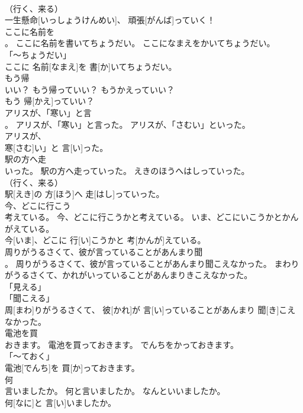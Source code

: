 \documentclass[8pt]{extreport}
\begin{document}
\begin{CJK}{UTF8}{min}
\\	（行く、来る） 
\\	一生懸命[いっしょうけんめい]、 頑張[がんば]っていく！		
\\	ここに名前を
\\	。	ここに名前を書いてちょうだい。	ここになまえをかいてちょうだい。	
\\	「～ちょうだい」 
\\	ここに 名前[なまえ]を 書[か]いてちょうだい。		
\\	もう帰
\\	いい？	もう帰っていい？	もうかえっていい？	
\\	もう 帰[かえ]っていい？		
\\	アリスが、「寒い」と言
\\	。	アリスが、「寒い」と言った。	アリスが、「さむい」といった。	
\\	アリスが、
\\	寒[さむ]い」と 言[い]った。		
\\	駅の方へ走
\\	いった。	駅の方へ走っていった。	えきのほうへはしっていった。	
\\	（行く、来る） 
\\	駅[えき]の 方[ほう]へ 走[はし]っていった。		
\\	今、どこに行こう
\\	考えている。	今、どこに行こうかと考えている。	いま、どこにいこうかとかんがえている。	
\\	今[いま]、どこに 行[い]こうかと 考[かんが]えている。		
\\	周りがうるさくて、彼が言っていることがあんまり聞
\\	。	周りがうるさくて、彼が言っていることがあんまり聞こえなかった。	まわりがうるさくて、かれがいっていることがあんまりきこえなかった。	
\\	「見える」 
\\	「聞こえる」 
\\	周[まわ]りがうるさくて、 彼[かれ]が 言[い]っていることがあんまり 聞[き]こえなかった。		
\\	電池を買
\\	おきます。	電池を買っておきます。	でんちをかっておきます。	
\\	「～ておく」 
\\	電池[でんち]を 買[か]っておきます。		
\\	何
\\	言いましたか。	何と言いましたか。	なんといいましたか。	
\\	何[なに]と 言[い]いましたか。		

\end{CJK}
\end{document}
